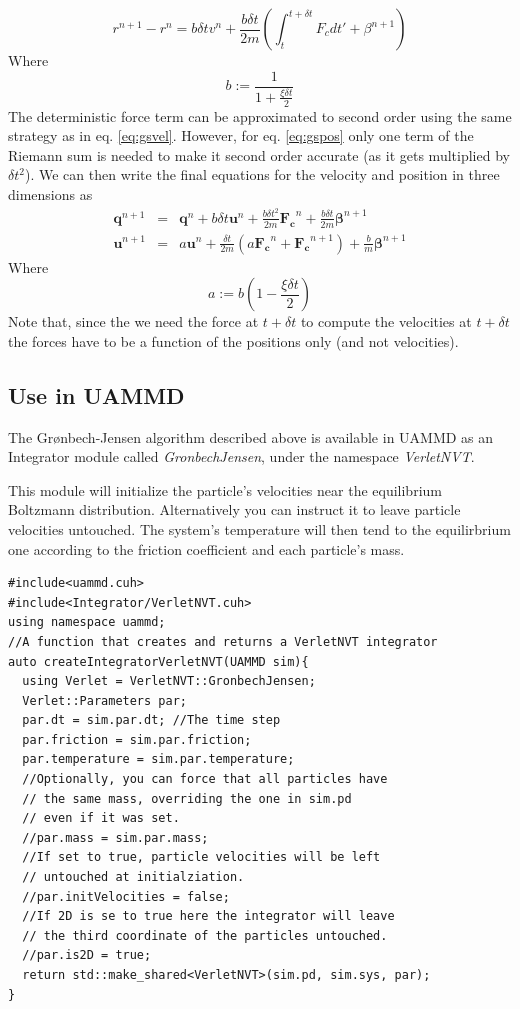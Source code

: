 \documentclass[ twoside,openright,titlepage,numbers=noenddot,%
headinclude,footinclude,cleardoublepage=empty,abstract=on,
BCOR=5mm,paper=a4,fontsize=11pt, dvipsnames
]{scrreprt}
\def\ucpp{uammd_cpp_lexer.py:UAMMDCppLexer -x}
\renewcommand{\vec}[1]{\bm{#1}}
\newcommand{\uammd}{\gls{UAMMD}\xspace}
\newcommand{\dt}{\delta t}
\newcommand{\ppos}{q}
\newcommand{\pvel}{u}
\begin{document}
\begin{equation}
  \label{eq:gspos}
  r^{n+1} - r^n =  b \dt v^n + \frac{b\dt}{2m}\left(\int_t^{t+\dt}F_cdt' + \beta^{n+1}\right)
\end{equation}
Where
\begin{equation}
b := \frac{1}{1+\frac{\xi\dt}{2}}
\end{equation}
The deterministic force term can be approximated to second order using the same strategy as in eq. \eqref{eq:gsvel}. However, for eq. \eqref{eq:gspos} only one term of the Riemann sum is needed to make it second order accurate (as it gets multiplied by $\dt^2$). We can then write the final equations for the velocity and position in three dimensions as
\begin{eqnarray}
  \label{eq:gsfinal}
  \vec{\ppos}^{n+1}  &=&  \vec{\ppos}^n + b \dt \vec{\pvel}^n + \frac{b\dt^2}{2m}\vec{F_c}^n + \frac{b\dt}{2m}\vec{\beta}^{n+1}\\
  \vec{\pvel}^{n+1} &=& a\vec{\pvel}^n + \frac{\dt}{2m}\left(a\vec{F_c}^n + \vec{F_c} ^{n+1}\right) +  \frac{b}{m}\vec{\beta}^{n+1}
\end{eqnarray}
Where
\begin{equation}
  a:=b \left(1-\frac{\xi\dt}{2}\right)
\end{equation}
Note that, since the we need the force at $t+\dt$ to compute the velocities at $t+\dt$ the forces have to be a function of the positions only (and not velocities).

\subsection{Use in UAMMD}
The Grønbech-Jensen algorithm described above is available in \uammd as an Integrator module called \emph{GronbechJensen}, under the namespace \emph{VerletNVT}.

This module will initialize the particle's velocities near the equilibrium Boltzmann distribution.
Alternatively you can instruct it to leave particle velocities untouched. The system's temperature will then tend to the equilirbrium one according to the friction coefficient and each particle's mass.

\begin{verbatim}
#include<uammd.cuh>
#include<Integrator/VerletNVT.cuh>
using namespace uammd;
//A function that creates and returns a VerletNVT integrator
auto createIntegratorVerletNVT(UAMMD sim){
  using Verlet = VerletNVT::GronbechJensen;
  Verlet::Parameters par;
  par.dt = sim.par.dt; //The time step
  par.friction = sim.par.friction;
  par.temperature = sim.par.temperature; 
  //Optionally, you can force that all particles have
  // the same mass, overriding the one in sim.pd
  // even if it was set.
  //par.mass = sim.par.mass;
  //If set to true, particle velocities will be left
  // untouched at initialziation.
  //par.initVelocities = false;
  //If 2D is se to true here the integrator will leave
  // the third coordinate of the particles untouched.
  //par.is2D = true;
  return std::make_shared<VerletNVT>(sim.pd, sim.sys, par);
}
\end{verbatim}
\end{document}
